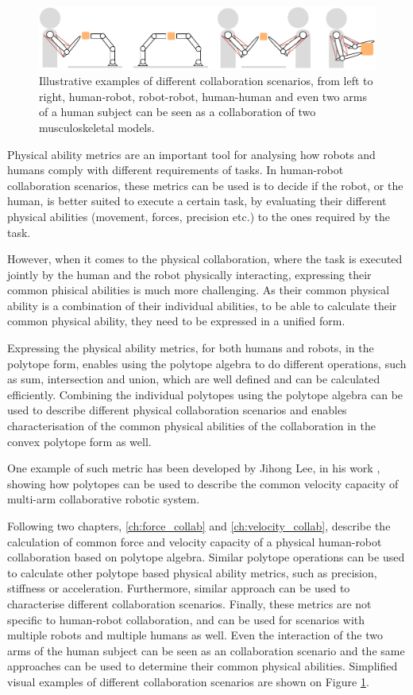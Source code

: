\begin{figure}[!h]
    \centering
    \includegraphics[width=\linewidth]{Chapters/imgs/collaboration.pdf}
    \caption{Illustrative examples of different collaboration scenarios, from left to right, human-robot, robot-robot, human-human and even two arms of a human subject can be seen as a collaboration of two musculoskeletal models.}
    \label{fig:collaboration_types}
\end{figure}

Physical ability metrics are an important tool for analysing how robots and humans comply with different requirements of tasks. In human-robot collaboration scenarios, these metrics can be used is to decide if the robot, or the human, is better suited to execute a certain task, by evaluating their different physical abilities (movement, forces, precision etc.) to the ones required by the task. 

However, when it comes to the physical collaboration, where the task is executed jointly by the human and the robot physically interacting, expressing their common phisical abilities is much more challenging. As their common physical ability is a combination of their individual abilities, to be able to calculate their common physical ability, they need to be expressed in a unified form.

Expressing the physical ability metrics, for both humans and robots, in the polytope form, enables using the polytope algebra to do different operations, such as sum, intersection and union, which are well defined and can be calculated efficiently. Combining the individual polytopes using the polytope algebra can be used to describe different physical collaboration scenarios and enables characterisation of the common physical abilities of the collaboration in the convex polytope form as well.

One example of such metric has been developed by Jihong Lee, in his work \cite{lee2001velocity}, showing how polytopes can be used to describe the common velocity capacity of multi-arm collaborative robotic system.

Following two chapters, \ref{ch:force_collab} and \ref{ch:velocity_collab}, describe the calculation of common force and velocity capacity of a physical human-robot collaboration based on polytope algebra. Similar polytope operations can be used to calculate other polytope based physical ability metrics, such as precision, stiffness or acceleration. Furthermore, similar approach can be used to characterise different collaboration scenarios. Finally, these metrics are not specific to human-robot collaboration, and can be used for scenarios with multiple robots and multiple humans as well. Even the interaction of the two arms of the human subject can be seen as an collaboration scenario and the same approaches can be used to determine their common physical abilities. Simplified visual examples of different collaboration scenarios are shown on Figure \ref{fig:collaboration_types}.

